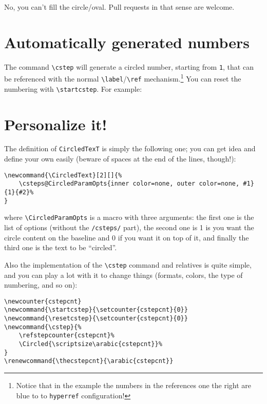 \documentclass{ltxdoc}
\begin{document}
No, you can't fill the circle/oval. Pull requests in that sense are welcome.

\section{Automatically generated numbers}

The command \verb|\cstep| will generate a circled number, starting from \texttt{1}, that can be referenced with the normal \verb|\label|/\verb|\ref| mechanism.\footnote{Notice that in the example the numbers in the references one the right are blue to to \texttt{hyperref} configuration!} You can reset the numbering with
\verb|\startcstep|. For example:






\bigskip

\section{Personalize it!}

The definition of \verb|CircledTexT| is simply the following one; you can get idea and define your own easily (beware of spaces at the end of the lines, though!):

\begin{lstlisting}
\newcommand{\CircledText}[2][]{%
    \csteps@CircledParamOpts{inner color=none, outer color=none, #1}{1}{#2}%
}
\end{lstlisting}

where \verb|\CircledParamOpts| is a macro with three arguments: the first one is the list of options (without the \texttt{/csteps/} part), the second one is 1 is you want the circle content on the baseline and 0 if you want it on top of it, and finally the third one is the text to be ``circled''.

Also the implementation of the \verb|\cstep| command and relatives is quite simple, and you can play a lot with it to change things (formats, colors, the type of numbering, and so on):

\begin{lstlisting}
\newcounter{cstepcnt}
\newcommand{\startcstep}{\setcounter{cstepcnt}{0}}
\newcommand{\resetcstep}{\setcounter{cstepcnt}{0}}
\newcommand{\cstep}{%
    \refstepcounter{cstepcnt}%
    \Circled{\scriptsize\arabic{cstepcnt}}%
}
\renewcommand{\thecstepcnt}{\arabic{cstepcnt}}
\end{lstlisting}
\end{document}
